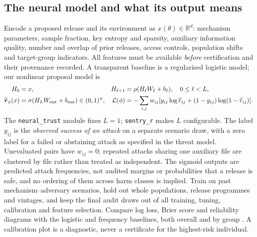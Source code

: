 \subsection{The neural model and what its output means}

Encode a proposed release and its environment as $x(\theta)\in\mathbb R^d$:
mechanism parameters, sample fraction, key entropy and sparsity, auxiliary
information quality, number and overlap of prior releases, access controls,
population shifts and target-group indicators. All features must be available
\emph{before} certification and their provenance recorded. A transparent
baseline is a regularised logistic model; our nonlinear proposal model is
\begin{align}
 H_0&=x, &H_{\ell+1}&=\rho(H_\ell W_\ell+b_\ell),\quad 0\leq\ell<L,\\
 \widehat{\boldsymbol r}_{\phi}(x)
   &=\sigma(H_LW_{\rm out}+b_{\rm out})\in(0,1)^n,
 &\mathcal L(\phi)&=-\sum_{i,j}w_{ij}
  [y_{ij}\log\widehat r_{ij}+(1-y_{ij})\log(1-\widehat r_{ij})].
 \label{eq:neural-risk}
\end{align}
The \texttt{neural\_trust} module fixes $L=1$; \texttt{sentry\_r} makes $L$
configurable.
The label $y_{ij}$ is the \emph{observed success of an attack} on a separate
scenario draw, with a zero label for a failed or abstaining attack as specified
in the threat model. Unevaluated pairs have $w_{ij}=0$; repeated attacks sharing
one auxiliary file are clustered by file rather than treated as independent.
The sigmoid outputs are predicted attack frequencies, not audited margins or
probabilities that a release is safe, and no ordering of them across harm classes is implied.
Train on past mechanism--adversary scenarios, hold out whole populations,
release programmes and vintages, and keep the final audit draws out of all
training, tuning, calibration and feature selection. Compare log loss, Brier
score and reliability diagrams with the logistic and frequency baselines, both
overall and by group \citep{guo2017}. A calibration plot is a diagnostic, never a certificate
for the highest-risk individual.

